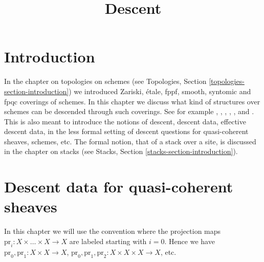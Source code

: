 

%


\title{Descent}

\maketitle

\label{section-phantom}

\tableofcontents

\section{Introduction}
\label{section-introduction}

\noindent
In the chapter on topologies on schemes
(see Topologies, Section \ref{topologies-section-introduction}) we introduced
Zariski, \'etale, fppf, smooth, syntomic and fpqc coverings of schemes.
In this chapter we discuss what kind of structures over schemes
can be descended through such coverings.
See for example \cite{Gr-I}, \cite{Gr-II}, \cite{Gr-III},
\cite{Gr-IV}, \cite{Gr-V}, and \cite{Gr-VI}.
This is also meant to introduce the notions of
descent, descent data, effective descent data, in the less formal
setting of descent questions for quasi-coherent sheaves, schemes, etc.
The formal notion, that of a stack over a site, is discussed in
the chapter on stacks (see Stacks, Section \ref{stacks-section-introduction}).

\section{Descent data for quasi-coherent sheaves}
\label{section-equivalence}

\noindent
In this chapter we will use the convention where
the projection maps $\text{pr}_i : X \times \ldots \times X \to X$
are labeled starting with $i = 0$. Hence we have
$\text{pr}_0, \text{pr}_1 : X \times X  \to X$,
$\text{pr}_0, \text{pr}_1, \text{pr}_2 : X \times X \times X  \to X$,
etc.


